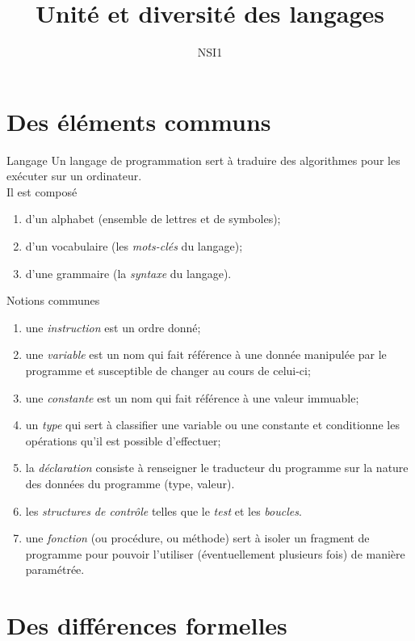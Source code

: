 \documentclass[10pt]{beamer}
\title{Unité et diversité des langages}
\author{NSI1}
\begin{document}
\section*{Des éléments communs}


\begin{frame}{Langage}
Un langage de programmation sert à traduire des algorithmes pour les exécuter sur un ordinateur.\\\pause
Il est composé \pause
\begin{enumerate}[\textbullet]
	\item 	d'un alphabet (ensemble de lettres et de symboles);\pause
	\item 	d'un vocabulaire (les \textit{mots-clés} du langage);\pause
	\item 	d'une grammaire (la \textit{syntaxe} du langage).
\end{enumerate}
\end{frame}


\begin{frame}{Notions communes}
\begin{enumerate}[\textbullet]
	\item 	une \textit{instruction} est un ordre donné;\pause
	\item 	une \textit{variable} est un nom qui fait référence à une donnée manipulée par le programme et susceptible de changer au cours de celui-ci;\pause
	\item 	une \textit{constante} est un nom qui fait référence à une valeur immuable;\pause
	\item 	un \textit{type} qui sert à classifier une variable ou une constante et conditionne les opérations qu'il est possible d'effectuer;\pause
	\item 	la \textit{déclaration} consiste à renseigner le traducteur du programme sur la nature des données du programme (type, valeur).\pause
	\item 	les \textit{structures de contrôle} telles que le \textit{test} et les \textit{boucles}.\pause
	\item 	une \textit{fonction} (ou procédure, ou méthode) sert à isoler un fragment de programme pour pouvoir l'utiliser (éventuellement plusieurs fois) de manière paramétrée.
\end{enumerate}
\end{frame}


\section{Des différences formelles}
\end{document}
